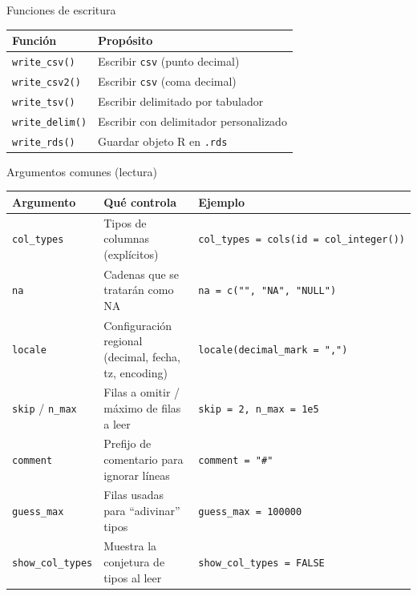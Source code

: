 \documentclass[
]{book}
\begin{document}
{} Funciones de escritura

\begin{longtable}[]{@{}ll@{}}
\toprule\noalign{}
Función & Propósito \\
\midrule\noalign{}
\endhead
\bottomrule\noalign{}
\endlastfoot
\texttt{write\_csv()} & Escribir \texttt{csv} (punto decimal) \\
\texttt{write\_csv2()} & Escribir \texttt{csv} (coma decimal) \\
\texttt{write\_tsv()} & Escribir delimitado por tabulador \\
\texttt{write\_delim()} & Escribir con delimitador personalizado \\
\texttt{write\_rds()} & Guardar objeto R en \texttt{.rds} \\
\end{longtable}

{} Argumentos comunes (lectura)

\begin{longtable}[]{@{}
  >{\raggedright\arraybackslash}p{}
  >{\raggedright\arraybackslash}p{}
  >{\raggedright\arraybackslash}p{}@{}}
\toprule\noalign{}
\begin{minipage}[b]{\linewidth}\raggedright
Argumento
\end{minipage} & \begin{minipage}[b]{\linewidth}\raggedright
Qué controla
\end{minipage} & \begin{minipage}[b]{\linewidth}\raggedright
Ejemplo
\end{minipage} \\
\midrule\noalign{}
\endhead
\bottomrule\noalign{}
\endlastfoot
\texttt{col\_types} & Tipos de columnas (explícitos) & \texttt{col\_types\ =\ cols(id\ =\ col\_integer())} \\
\texttt{na} & Cadenas que se tratarán como NA & \texttt{na\ =\ c("",\ "NA",\ "NULL")} \\
\texttt{locale} & Configuración regional (decimal, fecha, tz, encoding) & \texttt{locale(decimal\_mark\ =\ ",")} \\
\texttt{skip} / \texttt{n\_max} & Filas a omitir / máximo de filas a leer & \texttt{skip\ =\ 2,\ n\_max\ =\ 1e5} \\
\texttt{comment} & Prefijo de comentario para ignorar líneas & \texttt{comment\ =\ "\#"} \\
\texttt{guess\_max} & Filas usadas para ``adivinar'' tipos & \texttt{guess\_max\ =\ 100000} \\
\texttt{show\_col\_types} & Muestra la conjetura de tipos al leer & \texttt{show\_col\_types\ =\ FALSE} \\
\end{longtable}
\end{document}

